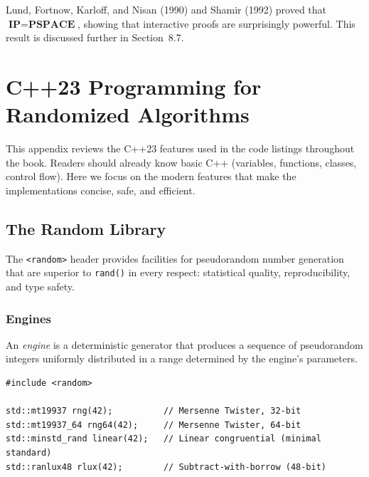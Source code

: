 \documentclass[twoside,12pt]{book}
\theoremstyle{plain}
\theoremstyle{definition}
\theoremstyle{remark}
\begin{document}
Lund, Fortnow, Karloff, and Nisan (1990) and Shamir (1992) proved that
$\textbf{IP} = \textbf{PSPACE}$, showing that interactive proofs are
surprisingly powerful. This result is discussed further in
Section~8.7.

\chapter{C++23 Programming for Randomized Algorithms}
\label{app:cpp}

This appendix reviews the C++23 features used in the code listings
throughout the book. Readers should already know basic C++ (variables,
functions, classes, control flow). Here we focus on the modern features
that make the implementations concise, safe, and efficient.

\section{The Random Library}
\label{app:sec:random-lib}

The \texttt{<random>} header provides facilities for pseudorandom number
generation that are superior to \texttt{rand()} in every respect:
statistical quality, reproducibility, and type safety.

\subsection{Engines}

An \emph{engine} is a deterministic generator that produces a sequence of
pseudorandom integers uniformly distributed in a range determined by the
engine's parameters.

\begin{lstlisting}[caption={Common PRNG engines}]
#include <random>

std::mt19937 rng(42);          // Mersenne Twister, 32-bit
std::mt19937_64 rng64(42);     // Mersenne Twister, 64-bit
std::minstd_rand linear(42);   // Linear congruential (minimal standard)
std::ranlux48 rlux(42);        // Subtract-with-borrow (48-bit)
\end{lstlisting}
\end{document}
